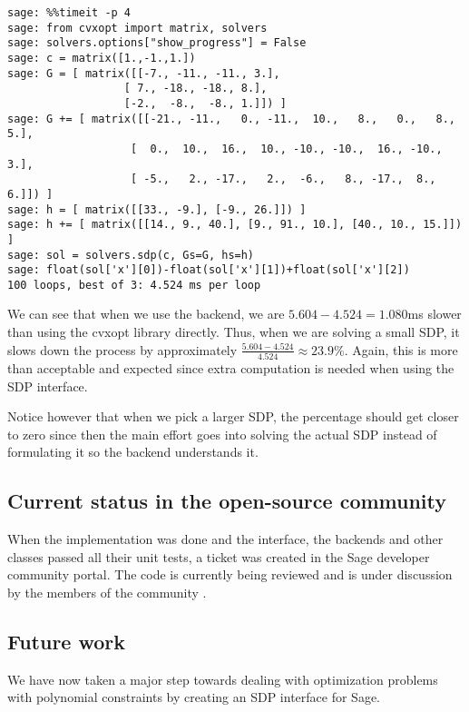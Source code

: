 \begin{verbatim}
sage: %%timeit -p 4 
sage: from cvxopt import matrix, solvers
sage: solvers.options["show_progress"] = False
sage: c = matrix([1.,-1.,1.])
sage: G = [ matrix([[-7., -11., -11., 3.],
                  [ 7., -18., -18., 8.],
                  [-2.,  -8.,  -8., 1.]]) ]
sage: G += [ matrix([[-21., -11.,   0., -11.,  10.,   8.,   0.,   8., 5.],
                   [  0.,  10.,  16.,  10., -10., -10.,  16., -10., 3.],
                   [ -5.,   2., -17.,   2.,  -6.,   8., -17.,  8., 6.]]) ]
sage: h = [ matrix([[33., -9.], [-9., 26.]]) ]
sage: h += [ matrix([[14., 9., 40.], [9., 91., 10.], [40., 10., 15.]]) ]
sage: sol = solvers.sdp(c, Gs=G, hs=h)
sage: float(sol['x'][0])-float(sol['x'][1])+float(sol['x'][2])
100 loops, best of 3: 4.524 ms per loop
\end{verbatim} 

We can see that when we use the backend, we are $5.604 - 4.524 = 1.080$ms slower than using the cvxopt library directly. Thus, when we are solving a small SDP, it slows down the process by approximately 
$\frac{5.604 - 4.524}{4.524} \approx 23.9\%$. Again, this is more than acceptable and expected since extra computation is needed when using the SDP interface. 

Notice however that when we pick a larger SDP, the percentage should get closer to zero since then the main effort goes into solving the actual SDP instead of formulating it so the backend understands it.


	\subsection{Current status in the open-source community}
When the implementation was done and the interface, the backends and other classes passed all their unit tests, a ticket was created in the Sage developer community portal. The code is currently being reviewed and is under discussion by the members of the community \cite{ticketsdp}.
	

	\subsection{Future work}
	We have now taken a major step towards dealing with optimization problems with polynomial constraints by creating an SDP interface for Sage. 
	
